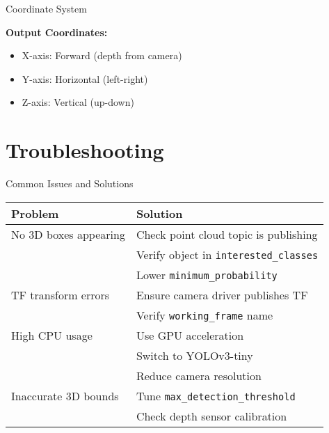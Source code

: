 \documentclass[aspectratio=169]{beamer}
\begin{document}
\begin{frame}{Coordinate System}
\begin{center}
\end{center}

\textbf{Output Coordinates:}
\begin{itemize}
    \item X-axis: Forward (depth from camera)
    \item Y-axis: Horizontal (left-right)
    \item Z-axis: Vertical (up-down)
\end{itemize}
\end{frame}

\section{Troubleshooting}

\begin{frame}{Common Issues and Solutions}
\begin{table}
\scriptsize
\begin{tabular}{|p{4cm}|p{5.5cm}|}
\hline
\textbf{Problem} & \textbf{Solution} \\
\hline
No 3D boxes appearing & Check point cloud topic is publishing\\
& Verify object in \texttt{interested\_classes}\\
& Lower \texttt{minimum\_probability} \\
\hline
TF transform errors & Ensure camera driver publishes TF\\
& Verify \texttt{working\_frame} name\\
\hline
High CPU usage & Use GPU acceleration\\
& Switch to YOLOv3-tiny\\
& Reduce camera resolution\\
\hline
Inaccurate 3D bounds & Tune \texttt{max\_detection\_threshold}\\
& Check depth sensor calibration\\
\hline
\end{tabular}
\end{table}
\end{frame}
\end{document}
